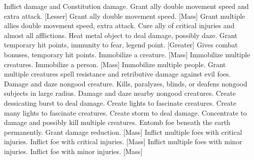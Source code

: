     {Inflict damage and Constitution damage.}
    {Grant ally double movement speed and extra attack.}
[Lesser]
    {Grant ally double movement speed.}
[Mass]
    {Grant multiple allies double movement speed, extra attack.}
    {Cure ally of critical injuries and almost all afflictions.}
    {Heat metal object to deal damage, possibly daze.}
    {Grant temporary hit points, immunity to fear, legend point.}
[Greater]
    {Gives combat bonuses, temporary hit points.}
    {Immobilize a creature.}
[Mass]
    {Immobilize multiple creatures.}
    {Immobilize a person.}
[Mass]
    {Immobilize multiple people.}
    {Grant multiple creatures spell resistance and retributive damage against evil foes.}
    {Damage and daze nongood creature.}
    {Kills, paralyzes, blinds, or deafens nongood subjects in large radius.}
    {Damage and daze nearby nongood creatures.}
    {Create dessicating burst to deal damage.}
    {Create lights to fascinate creatures.}
    {Create many lights to fascinate creatures.}
    {Create storm to deal damage.}
    {Concentrate to damage and possibly kill multiple creatures.}
    {Entomb foe beneath the earth permanently.}
    {Grant damage reduction.}
[Mass]
    {Inflict multiple foes with critical injuries.}
    {Inflict foe with critical injuries.}
[Mass]
    {Inflict multiple foes with minor injuries.}
    {Inflict foe with minor injuries.}
[Mass]
